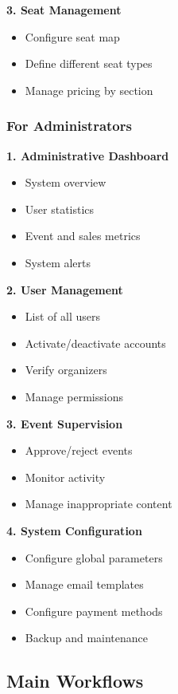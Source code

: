 \documentclass[12pt,a4paper]{article}
\begin{document}
\textbf{3. Seat Management}
\begin{itemize}
    \item Configure seat map
    \item Define different seat types
    \item Manage pricing by section
\end{itemize}

\subsubsection{For Administrators}

\textbf{1. Administrative Dashboard}
\begin{itemize}
    \item System overview
    \item User statistics
    \item Event and sales metrics
    \item System alerts
\end{itemize}

\textbf{2. User Management}
\begin{itemize}
    \item List of all users
    \item Activate/deactivate accounts
    \item Verify organizers
    \item Manage permissions
\end{itemize}

\textbf{3. Event Supervision}
\begin{itemize}
    \item Approve/reject events
    \item Monitor activity
    \item Manage inappropriate content
\end{itemize}

\textbf{4. System Configuration}
\begin{itemize}
    \item Configure global parameters
    \item Manage email templates
    \item Configure payment methods
    \item Backup and maintenance
\end{itemize}

\subsection{Main Workflows}
\end{document}
